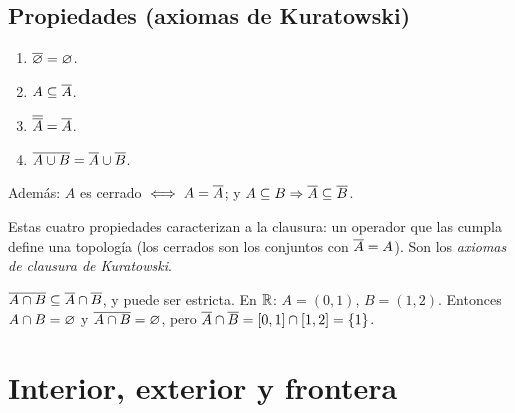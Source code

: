 \subsection{Propiedades (axiomas de Kuratowski)}
\begin{teorema}
\begin{enumerate}[label=(K\arabic*),leftmargin=2.6em]
\item $\overline{\varnothing}=\varnothing$.
\item $A\subseteq\overline{A}$.
\item $\overline{\overline{A}}=\overline{A}$.
\item $\overline{A\cup B}=\overline{A}\cup\overline{B}$.
\end{enumerate}
Además: $A$ es cerrado $\iff A=\overline{A}$; y $A\subseteq B\Rightarrow\overline{A}\subseteq\overline{B}$.
\end{teorema}
Estas cuatro propiedades caracterizan a la clausura: un operador que las cumpla define una topología (los cerrados
son los conjuntos con $\overline{A}=A$). Son los \emph{axiomas de clausura de Kuratowski}.

\begin{ojo}
$\overline{A\cap B}\subseteq\overline{A}\cap\overline{B}$, y puede ser estricta. En $\mathbb{R}$: $A=(0,1)$, $B=(1,2)$. Entonces
$A\cap B=\varnothing$ y $\overline{A\cap B}=\varnothing$, pero $\overline{A}\cap\overline{B}=[0,1]\cap[1,2]=\{1\}$.
\end{ojo}

\section{Interior, exterior y frontera}
